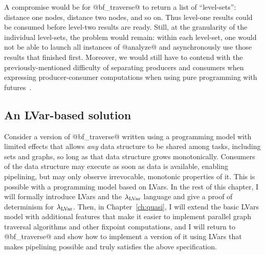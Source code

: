 A compromise would be for @bf_traverse@ to return a list of
``level-sets'': distance one nodes, distance two nodes, and so on.
Thus level-one results could be consumed before level-two results are
ready.  Still, at the granularity of the individual level-sets, the
problem would remain: within each level-set, one would not be able to
launch all instances of @analyze@ and asynchronously use those results
that finished first.  Moreover, we would still have to contend with
the previously-mentioned difficulty of separating producers and
consumers when expressing producer-consumer computations when using
pure programming with futures~\cite{monad-par}.

\subsection{An LVar-based solution}

Consider a version of @bf_traverse@ written using a programming model
with limited effects that allows \emph{any} data structure to be
shared among tasks, including sets and graphs, so long as that data
structure grows monotonically.  Consumers of the data structure may
execute as soon as data is available, enabling pipelining, but may
only observe irrevocable, monotonic properties of it. This is possible
with a programming model based on LVars.  In the rest of this chapter,
I will formally introduce LVars and the $\lambda_{\textrm{LVar}}$ language and
give a proof of determinism for $\lambda_{\textrm{LVar}}$.  Then, in
Chapter~\ref{ch:quasi}, I will extend the basic LVars model with
additional features that make it easier to implement parallel graph
traversal algorithms and other fixpoint computations, and I will
return to @bf_traverse@ and show how to implement a version of it
using LVars that makes pipelining possible and truly satisfies the
above specification.
